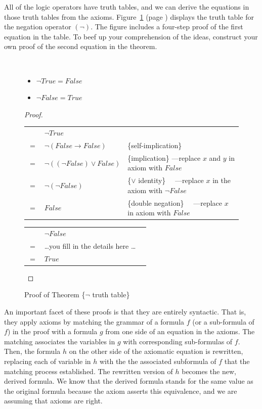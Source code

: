 All of the logic operators have truth tables,
and we can derive the equations in those truth tables from the axioms.
Figure~\ref{fig:neg-truth-table} (page \pageref{fig:neg-truth-table})
displays the truth table
for the negation operator $(\neg)$.
The figure includes a four-step proof of the first equation in
the table.
To beef up your comprehension of the ideas,
construct your own proof of the second equation in the theorem.

\begin{figure}
\begin{theorem}
\mbox{}\\
\begin{itemize}
\item $\neg True = False$
\item $\neg False = True$
\end{itemize}
\end{theorem}
\begin{proof}
\mbox{} \\
\begin{tabular}{llp{3.15in}}
    & $\neg True$                      & \\
$=$ & $\neg (False \rightarrow False)$ & \{self-implication\} \\
$=$ & $\neg ((\neg False) \vee False)$ & \{implication\}     ---replace $x$ and $y$ in axiom with $False$ \\
$=$ & $\neg (\neg False)$              & \{$\vee$ identity\} ~~---replace $x$ in the axiom with $\neg False$ \\
$=$ & $False$                          & \{double negation\} ~~---replace $x$ in axiom with $False$ \\
\end{tabular}

\bigskip
\noindent
\begin{tabular}{lll}
    & $\neg False$                             & \\
$=$ & \dots you fill in the details here \dots & \\
$=$ & $True$                                   & \\
\end{tabular}

\end{proof}
\caption{Proof of Theorem \{$\neg$ truth table\}}
\label{fig:neg-truth-table}
\end{figure}

An important facet of these proofs is that they are
entirely syntactic. That is, they apply axioms by
matching the grammar of a formula $f$ (or a sub-formula of $f$) in the proof
with a formula $g$ from one side of an equation in the axioms.
The matching associates the variables in $g$ with corresponding sub-formulas of $f$.
Then, the formula $h$ on the other side of
the axiomatic equation is rewritten,
replacing each of variable in $h$ with the the associated subformula of $f$
that the matching process established.
The rewritten version of $h$
becomes the new, derived formula.
We know that the derived formula stands for the same value
as the original formula because the axiom asserts this equivalence,
and we are assuming that axioms are right.

